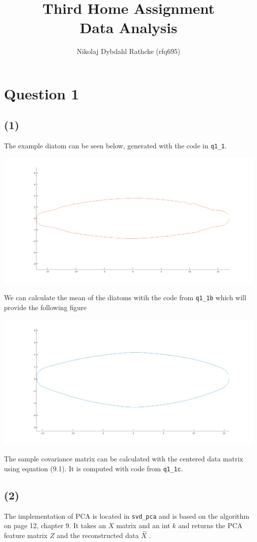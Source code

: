 \documentclass[a4paper]{article}
\author{Nikolaj Dybdahl Rathcke (rfq695)}
\title{Third Home Assignment \\ Data Analysis}
\begin{document}
\maketitle
\section*{Question 1}
\subsection*{(1)}
The example diatom can be seen below, generated with the code in \texttt{q1\_1}.
\begin{center}
\includegraphics[scale=0.3]{fig1}
\end{center}
We can calculate the mean of the diatoms witih the code from \texttt{q1\_1b} which will provide the following figure
\begin{center}
\includegraphics[scale=0.3]{fig2}
\end{center}
The sample covariance matrix can be calculated with the centered data matrix using equation (9.1). It is computed with code from \texttt{q1\_1c}.

\subsection*{(2)}
The implementation of PCA is located in \texttt{svd\_pca} and is based on the algorithm on page 12, chapter 9. It takes an $X$ matrix and an int $k$ and returns the PCA feature matrix $Z$ and the reconstructed data $\hat{X}$ .
\end{document}
